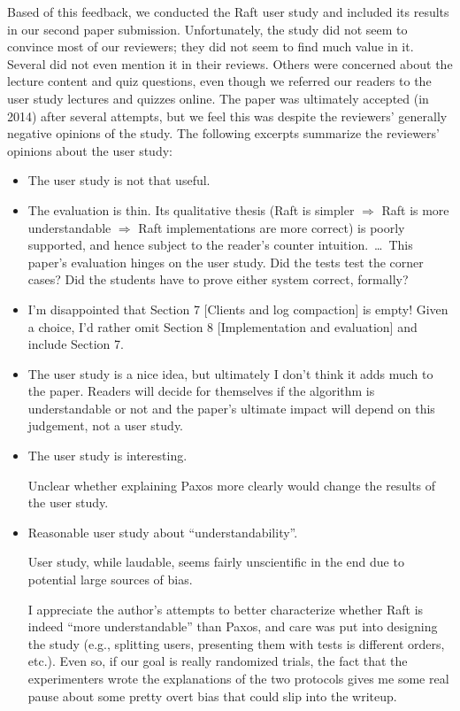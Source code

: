 Based of this feedback, we conducted the Raft user study and included
its results in our second paper submission. Unfortunately, the study did
not seem to convince most of our reviewers; they did not seem to find
much value in it. Several did not even mention it in their reviews.
Others were concerned about the lecture content and quiz questions, even
though we referred our readers to the user study lectures and quizzes
online. The paper was ultimately accepted (in 2014) after several attempts, but
we feel this was despite the reviewers' generally negative opinions of
the study. The following excerpts summarize the reviewers' opinions
about the user study:

\begin{itemize}
\em


\item The user study is not that useful.

\item The evaluation is thin.  Its qualitative thesis (Raft is simpler
$\Rightarrow$ Raft is more understandable $\Rightarrow$ Raft
implementations are more correct) is poorly supported, and hence subject
to the reader's counter intuition.\ \ldots\ 
This paper's evaluation hinges on the user study. Did the tests test the
corner cases? Did the students have to prove either system correct,
formally?

\item I'm disappointed that Section 7 [Clients and log compaction] is
empty! Given a choice, I'd rather omit Section 8 [Implementation and
evaluation] and include Section 7.

\item The user study is a nice idea, but ultimately I don't think it
adds much to the paper. Readers will decide for themselves if the
algorithm is understandable or not and the paper's ultimate impact will
depend on this judgement, not a user study.



\item The user study is interesting.

Unclear whether explaining Paxos more clearly would change the
results of the user study.

\item Reasonable user study about ``understandability''.

User study, while laudable, seems fairly unscientific in the end due
to potential large sources of bias.

I appreciate the author's attempts to better characterize
whether Raft is indeed ``more understandable'' than Paxos, and care was
put into designing the study (e.g., splitting users, presenting them
with tests is different orders, etc.).  Even so, if our goal is really
randomized trials, the fact that the experimenters wrote the
explanations of the two protocols gives me some real pause about some
pretty overt bias that could slip into the writeup.


\end{itemize}
